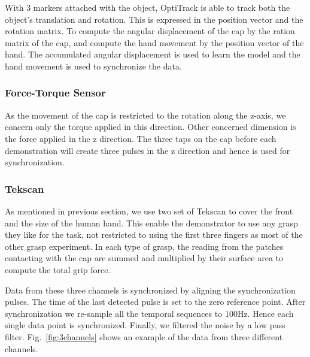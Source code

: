 With 3 markers attached with the object, OptiTrack is able to track both the object's translation and rotation. This is expressed in the position vector and the rotation matrix. To compute the angular displacement of the cap by the ration matrix of the cap, and compute the hand movement by the position vector of the hand. The accumulated angular displacement is used to learn the model and the hand movement is used to synchronize the data.

\subsubsection{Force-Torque Sensor}

As the movement of the cap is restricted to the rotation along the z-axis, we concern only the torque applied in this direction.
Other concerned dimension is the force applied in the z direction. The three taps on the cap before each demonstration will create three pulses in the z direction and hence is used for synchronization.



\subsubsection{Tekscan}

As mentioned in previous section, we use two set of Tekscan to cover the front and the size of the human hand. This enable the demonstrator to use any grasp they like for the task, not restricted to using the first three fingers as most of the other grasp experiment. In each type of grasp, the reading from the patches contacting with the cap are summed and multiplied by their surface area to compute the total grip force.

Data from these three channels is synchronized by aligning the synchronization pulses. The time of the last detected pulse is set to the zero reference point. After synchronization we re-sample all the temporal sequences to 100Hz. Hence each single data point is synchronized. Finally, we filtered the noise by a low pass filter. Fig.~\ref{fig:3channels} shows an example of the data from three different channels.




